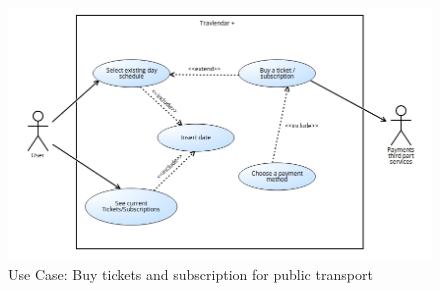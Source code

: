 \documentclass[numbers=noenddot, 12pt, a4paper, oneside]{scrbook}
\begin{document}
\begin{figure}[H]
	\includegraphics[width=1\textwidth]{usecases/Scenario5}
	\caption{Use Case: Buy tickets and subscription for public transport}
\end{figure}
\end{document}
